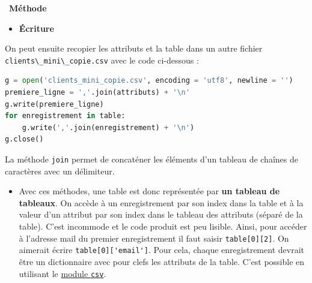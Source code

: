 \documentclass[
  11pt,
]{article}
\newcommand{\passthrough}[1]{#1}
\providecommand{\tightlist}{%
  \setlength{\itemsep}{0pt}\setlength{\parskip}{0pt}}
\newenvironment{methode}[1]
{\par \medskip    \noindent  
 \begin {bclogo}[arrondi =0.1,logo=\bcoutil, marge=4,noborder = true] {~\textbf{Méthode}   {\itshape #1} }  \par}
{
\end{bclogo}
 \par \bigskip }
\begin{document}
\begin{methode}{}
\begin{itemize}
\tightlist
\item
  \textbf{Écriture}
\end{itemize}

On peut ensuite recopier les attributs et la table dans un autre fichier
\passthrough{\lstinline!clients\_mini\_copie.csv!} avec le code
ci-dessous :

\begin{lstlisting}[language=Python]
g = open('clients_mini_copie.csv', encoding = 'utf8', newline = '')
premiere_ligne = ','.join(attributs) + '\n'
g.write(premiere_ligne)
for enregistrement in table:
    g.write(','.join(enregistrement) + '\n')
g.close()
\end{lstlisting}

La méthode \passthrough{\lstinline!join!} permet de concaténer les
éléments d'un tableau de chaînes de caractères avec un délimiteur.

\begin{itemize}
\tightlist
\item
  Avec ces méthodes, une table est donc représentée par \textbf{un
  tableau de tableaux}. On accède à un enregistrement par son index dans
  la table et à la valeur d'un attribut par son index dans le tableau
  des attributs (séparé de la table). C'est incommode et le code produit
  est peu lisible. Ainsi, pour accéder à l'adresse mail du premier
  enregistrement il faut saisir \passthrough{\lstinline!table[0][2]!}.
  On aimerait écrire \passthrough{\lstinline!table[0]['email']!}. Pour
  cela, chaque enregistrement devrait être un dictionnaire avec pour
  clefs les attributs de la table. C'est possible en utilisant le
  \href{https://docs.python.org/fr/3/library/csv.html}{module
  \passthrough{\lstinline!csv!}}.
\end{itemize}

\end{methode}
\end{document}
